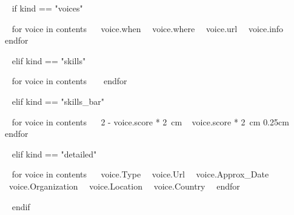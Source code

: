 ~{ if kind == "voices" }~


    ~{ for voice in contents }~
        {~{{voice.when}}~}
        {~{{voice.where}}~}
        {~{{voice.url}}~}       
        {~{{voice.info}}~}~{ endfor }~

~{ elif kind == "skills" }~

    
    ~{ for voice in contents }~
    ~{ endfor }~
        

~{ elif kind == "skills_bar" }~

    
    ~{ for voice in contents }~
    {~{{2 - voice.score * 2}}~cm}
    {~{{    voice.score * 2}}~cm}
    {0.25cm}~{ endfor }~

~{ elif kind == "detailed" }~


    ~{ for voice in contents }~
    {~{{voice.Type}}~}
    {~{{voice.Url}}~}
    {~{{voice.Approx_Date}}~}
    {~{{voice.Organization}}~}
    {~{{voice.Location}}~}
    {~{{voice.Country}}~}~{ endfor }~


~{ endif }~


